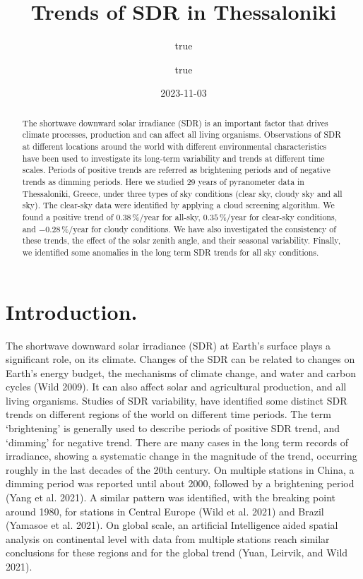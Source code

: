 \documentclass[
  preprint, 3p, authoryear]{article}
\title{Trends of SDR in Thessaloniki}
\author{true \and true}
\date{2023-11-03}
\begin{document}
\maketitle
\begin{abstract}
The shortwave downward solar irradiance (SDR) is an important factor that drives climate processes, production and can affect all living organisms.
Observations of SDR at different locations around the world with different environmental characteristics have been used to investigate its long-term variability and trends at different time scales.
Periods of positive trends are referred as brightening periods and of negative trends as dimming periods.
Here we studied 29 years of pyranometer data in Thessaloniki, Greece, under three types of sky conditions (clear sky, cloudy sky and all sky).
The clear-sky data were identified by applying a cloud screening algorithm. We found a positive trend of \(0.38\,\%/\text{year}\) for all-sky, \(0.35\,\%/\text{year}\) for clear-sky conditions, and \(-0.28\,\%/\text{year}\) for cloudy conditions.
We have also investigated the consistency of these trends, the effect of the solar zenith angle, and their seasonal variability.
Finally, we identified some anomalies in the long term SDR trends for all sky conditions.
\end{abstract}

\hypertarget{introduction.}{%
\section{Introduction.}\label{introduction.}}

The shortwave downward solar irradiance (SDR) at Earth's surface plays a significant role, on its climate.
Changes of the SDR can be related to changes on Earth's energy budget, the mechanisms of climate change, and water and carbon cycles (Wild 2009).
It can also affect solar and agricultural production, and all living organisms.
Studies of SDR variability, have identified some distinct SDR trends on different regions of the world on different time periods.
The term `brightening' is generally used to describe periods of positive SDR trend, and `dimming' for negative trend.
There are many cases in the long term records of irradiance, showing a systematic change in the magnitude of the trend, occurring roughly in the last decades of the 20th century.
On multiple stations in China, a dimming period was reported until about 2000, followed by a brightening period (Yang et al. 2021).
A similar pattern was identified, with the breaking point around 1980, for stations in Central Europe (Wild et al. 2021) and Brazil (Yamasoe et al. 2021).
On global scale, an artificial Intelligence aided spatial analysis on continental level with data from multiple stations reach similar conclusions for these regions and for the global trend (Yuan, Leirvik, and Wild 2021).
\end{document}
